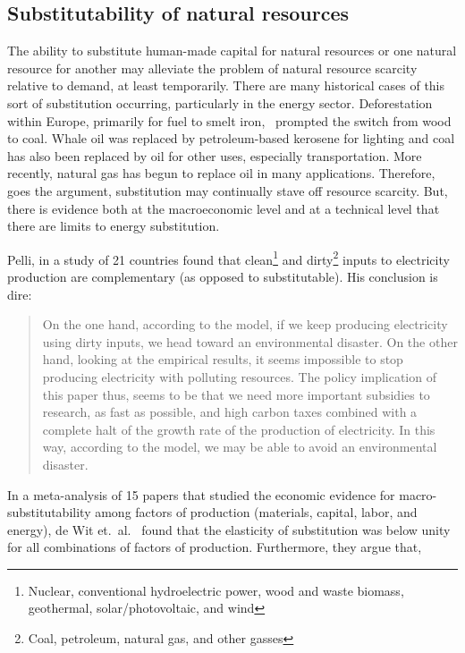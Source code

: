 \subsection{Substitutability of natural resources}

The ability to substitute human-made capital for natural resources
or one natural resource for another 
may alleviate the problem of natural resource scarcity relative to demand,
at least temporarily.
There are many historical cases of this sort of substitution occurring,
particularly in the energy sector.
Deforestation within Europe,
primarily for fuel to smelt iron,~\cite{Smil1994}
prompted the switch from wood to coal.
Whale oil was replaced by petroleum-based kerosene for lighting and
coal has also been replaced by oil for other uses, 
especially transportation.\cite{Weissenbacher2009}
More recently, natural gas has begun to replace oil in many applications.
Therefore, goes the argument, 
substitution may continually stave off resource scarcity.
But, there is evidence both at the macroeconomic level and 
at a technical level that there are limits to energy substitution.

Pelli, in a study of 21 countries 
found that clean\footnote{Nuclear, 
	conventional hydroelectric power, wood and waste biomass, 
	geothermal, solar/photovoltaic, and wind
	}
and dirty\footnote{Coal, 
	petroleum, natural gas, and other gasses
	}
inputs to electricity production
are complementary (as opposed to substitutable).\cite{Pelli:2012wv}
His conclusion is dire:

\begin{quote}
	On the one hand, according to the model, 
	if we keep producing electricity using dirty inputs, 
	we head toward an environmental disaster. 
	On the other hand, looking at the empirical results, 
	it seems impossible to stop producing electricity with polluting resources. 
	The policy implication of this paper thus, 
	seems to be that we need more important subsidies to research, 
	as fast as possible, 
	and high carbon taxes combined with a complete halt 
	of the growth rate of the production of electricity. 
	In this way, according to the model, 
	we may be able to avoid an environmental disaster.\cite[p.~25]{Pelli:2012wv}
\end{quote}

In a meta-analysis of 15 papers that studied 
the economic evidence for macro-substitutability
among factors of production (materials, capital, labor, and energy), 
de Wit et.\ al.~\cite{de-Wit:2013aa} found that the elasticity of substitution was 
below unity for all combinations of factors of production.
Furthermore, they argue that, 

